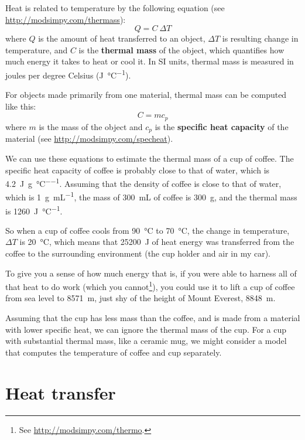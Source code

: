 \documentclass[12pt]{book}
\theoremstyle{exercise}
\begin{document}
Heat is related to temperature by the following equation (see \url{http://modsimpy.com/thermass}):
%
\[ Q = C~\Delta T \]
%
where $Q$ is the amount of heat transferred to an object, $\Delta T$ is resulting change in temperature, and $C$ is the {\bf thermal mass} of the object, which quantifies how much energy it takes to heat or cool it.  
In SI units, thermal mass is measured in joules per degree Celsius (\si{\joule\per\celsius}).


For objects made primarily from one material, thermal mass can be computed like this:
%
\[ C = m c_p \]
%
where $m$ is the mass of the object and $c_p$ is the {\bf specific heat capacity} of the material (see \url{http://modsimpy.com/specheat}).


We can use these equations to estimate the thermal mass of a cup of coffee.  The specific heat capacity of coffee is probably close to that of water, which is \SI{4.2}{\joule\per\gram\per\celsius}.  Assuming that the density of coffee is close to that of water, which is \SI{1}{\gram\per\milli\liter}, the mass of \SI{300}{\milli\liter} of coffee is \SI{300}{\gram}, and the thermal mass is \SI{1260}{\joule\per\celsius}.


So when a cup of coffee cools from \SI{90}{\celsius} to \SI{70}{\celsius}, the change in temperature, $\Delta T$ is \SI{20}{\celsius}, which means that \SI{25200}{\joule} of heat energy was transferred from the coffee to the surrounding environment (the cup holder and air in my car).

To give you a sense of how much energy that is, if you were able to harness all of that heat to do work (which you cannot\footnote{See \url{http://modsimpy.com/thermo}.}), you could use it to lift a cup of coffee from sea level to \SI{8571}{\meter}, just shy of the height of Mount Everest, \SI{8848}{\meter}.


Assuming that the cup has less mass than the coffee, and is made from a material with lower specific heat, we can ignore the thermal mass of the cup.
For a cup with substantial thermal mass, like a ceramic mug, we might consider a model that computes the temperature of coffee and cup separately.


\section{Heat transfer}
\end{document}
